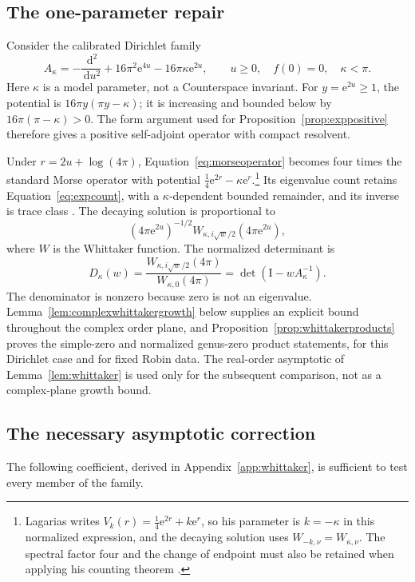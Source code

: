 \documentclass[11pt,letterpaper]{article}
\numberwithin{equation}{section}
\theoremstyle{definition}
\theoremstyle{remark}
\newcommand{\Id}{\mathrm I}
\newcommand{\dd}{\,\mathrm d}
\newcommand{\e}{\mathrm e}
\begin{document}
\subsection{The one-parameter repair}
Consider the calibrated Dirichlet family
\begin{equation}
 A_\kappa=-\frac{\dd^2}{\dd u^2}
     +16\pi^2\e^{4u}-16\pi\kappa\e^{2u},
 \qquad u\geq0,\quad f(0)=0,\quad\kappa<\pi.
 \label{eq:morseoperator}
\end{equation}
Here $\kappa$ is a model parameter, not a Counterspace invariant. For $y=\e^{2u}\geq1$, the potential is $16\pi y(\pi y-\kappa)$; it is increasing and bounded below by $16\pi(\pi-\kappa)>0$. The form argument used for Proposition~\ref{prop:exppositive} therefore gives a positive self-adjoint operator with compact resolvent.

Under $r=2u+\log(4\pi)$, Equation~\eqref{eq:morseoperator} becomes four times the standard Morse operator with potential $\frac14\e^{2r}-\kappa\e^r$.\footnote{Lagarias writes $V_k(r)=\tfrac14\e^{2r}+k\e^r$, so his parameter is $k=-\kappa$ in this normalized expression, and the decaying solution uses $W_{-k,\nu}=W_{\kappa,\nu}$. The spectral factor four and the change of endpoint must also be retained when applying his counting theorem \cite[Theorems~2.1 and 3.2]{lagarias}.} Its eigenvalue count retains Equation~\eqref{eq:expcount}, with a $\kappa$-dependent bounded remainder, and its inverse is trace class \cite{lagarias}. The decaying solution is proportional to
\begin{equation}
 (4\pi\e^{2u})^{-1/2}
 W_{\kappa,i\sqrt w/2}(4\pi\e^{2u}),
\end{equation}
where $W$ is the Whittaker function. The normalized determinant is
\begin{equation}
 D_\kappa(w)=\frac{W_{\kappa,i\sqrt w/2}(4\pi)}{W_{\kappa,0}(4\pi)}
           =\det(\Id-wA_\kappa^{-1}).
 \label{eq:morsedet}
\end{equation}
The denominator is nonzero because zero is not an eigenvalue. Lemma~\ref{lem:complexwhittakergrowth} below supplies an explicit bound throughout the complex order plane, and Proposition~\ref{prop:whittakerproducts} proves the simple-zero and normalized genus-zero product statements, for this Dirichlet case and for fixed Robin data. The real-order asymptotic of Lemma~\ref{lem:whittaker} is used only for the subsequent comparison, not as a complex-plane growth bound.

\subsection{The necessary asymptotic correction}
The following coefficient, derived in Appendix~\ref{app:whittaker}, is sufficient to test every member of the family.
\end{document}

